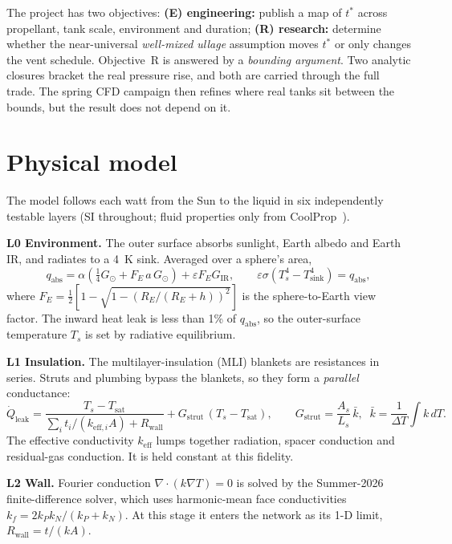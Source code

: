\documentclass[11pt]{article}
\newcommand{\Qd}{\dot Q}
\begin{document}
The project has two objectives:
\textbf{(E) engineering:} publish a map of $t^*$ across propellant, tank scale, environment and duration;
\textbf{(R) research:} determine whether the near-universal \emph{well-mixed ullage} assumption moves $t^*$
or only changes the vent schedule. Objective~R is answered by a \emph{bounding argument}. Two analytic
closures bracket the real pressure rise, and both are carried through the full trade. The spring CFD
campaign then refines where real tanks sit between the bounds, but the result does not depend on it.

\section{Physical model}
The model follows each watt from the Sun to the liquid in six independently testable layers (SI throughout;
fluid properties only from CoolProp~\cite{coolprop}).

\textbf{L0 Environment.} The outer surface absorbs sunlight, Earth albedo and Earth IR, and radiates to a
4~K sink. Averaged over a sphere's area,
\begin{equation}
q_\text{abs}=\alpha\left(\tfrac14 G_\odot + F_E\,a\,G_\odot\right)+\varepsilon F_E G_\text{IR},\qquad
\varepsilon\sigma\left(T_s^4-T_\text{sink}^4\right)=q_\text{abs},
\end{equation}
where $F_E=\tfrac12\left[1-\sqrt{1-(R_E/(R_E+h))^2}\right]$ is the sphere-to-Earth view factor. The inward
heat leak is less than 1\% of $q_\text{abs}$, so the outer-surface temperature $T_s$ is set by radiative equilibrium.

\textbf{L1 Insulation.} The multilayer-insulation (MLI) blankets are resistances in series. Struts and
plumbing bypass the blankets, so they form a \emph{parallel} conductance:
\begin{equation}
\Qd_\text{leak}=\frac{T_s-T_\text{sat}}{\sum_i t_i/(k_{\text{eff},i}A)+R_\text{wall}}
+G_\text{strut}\,(T_s-T_\text{sat}),\qquad
G_\text{strut}=\frac{A_s}{L_s}\,\bar k,\;\;\bar k=\frac{1}{\Delta T}\!\int k\,dT .
\end{equation}
The effective conductivity $k_\text{eff}$ lumps together radiation, spacer conduction and residual-gas
conduction. It is held constant at this fidelity.

\textbf{L2 Wall.} Fourier conduction $\nabla\!\cdot(k\nabla T)=0$ is solved by the Summer-2026 finite-difference
solver, which uses harmonic-mean face conductivities $k_f=2k_Pk_N/(k_P+k_N)$. At this stage it enters the
network as its 1-D limit, $R_\text{wall}=t/(kA)$.
\end{document}

